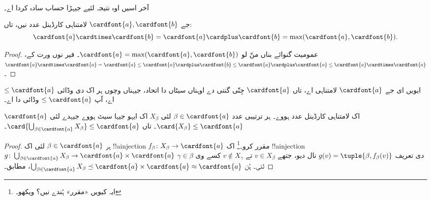 \documentclass[../../../include/open-logic-section]{subfiles}
\begin{document}
آخر اسیں اوہ نتیجہ لئیے جیہڑا حساب سادہ کردا اے۔

\begin{thm}
جے $\cardfont{a}, \cardfont{b}$ لامتناہی کارڈینل عدد نیں، تاں:
\[
	\cardfont{a}
\cardtimes \cardfont{b} = \cardfont{a} \cardplus \cardfont{b} =
\text{max}(\cardfont{a}, \cardfont{b}).
\]
\end{thm}

\begin{proof}
عمومیت گنوائے بناں منّ لو $\cardfont{a} = \max(\cardfont{a},
\cardfont{b})$۔ فیر  نوں ورت کے،
$\cardfont{a}\cardtimes\cardfont{a} = \cardfont{a} \leq \cardfont{a}
\cardplus \cardfont{b} \leq \cardfont{a} \cardplus \cardfont{a} \leq
\cardfont{a} \cardtimes \cardfont{a}$۔ \end{proof}\noindent ایویں ای جے $\cardfont{a}$ لامتناہی اے، تاں $\cardfont{a}$ جِنّی گنتی دے اوہناں سیٹاں دا اتحاد، جیہناں وچوں ہر اک دی وڈائی $\leq\cardfont{a}$ اے، آپ $\leq\cardfont{a}$ وڈائی دا اے۔

\begin{prop}
$\cardfont{a}$ اک لامتناہی کارڈینل عدد ہووے۔ ہر ترتیبی عدد $\beta
\in \cardfont{a}$ لئی $X_\beta$ اک ایہو جیہا سیٹ ہووے جیہدے لئی $\card{X_\beta} \leq
\cardfont{a}$۔ تاں $\card{\bigcup_{\beta \in \cardfont{a}} X_\beta}
\leq \cardfont{a}$۔
\end{prop}

\begin{proof}
ہر $\beta \in \cardfont{a}$ لئی اک !!a{injection} $f_\beta \colon
X_\beta \to \cardfont{a}$ مقرر کرو۔\footnote{ایہ کیویں «مقرر» ہُندے نیں؟  ویکھو۔} اک !!a{injection} $g \colon
\bigcup_{\beta \in \cardfont{a}} X_\beta \to \cardfont{a} \times
\cardfont{a}$ دی تعریف $g(v) = \tuple{\beta, f_\beta(v)}$ نال دیو، جتھے $v \in
X_\beta$ تے $v \notin X_\gamma$ کسے وی $\gamma \in \beta$ لئی۔ ہُن $\bigcup_{\beta \in \cardfont{a}} X_\beta \preceq \cardfont{a} \times
\cardfont{a} \approx \cardfont{a}$،  مطابق۔
\end{proof}
\end{document}
